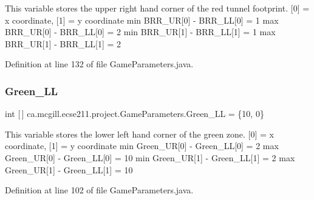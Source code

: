 This variable stores the upper right hand corner of the red tunnel footprint. \mbox{[}0\mbox{]} = x coordinate, \mbox{[}1\mbox{]} = y coordinate min B\+R\+R\+\_\+\+UR\mbox{[}0\mbox{]} -\/ B\+R\+R\+\_\+\+LL\mbox{[}0\mbox{]} = 1 max B\+R\+R\+\_\+\+UR\mbox{[}0\mbox{]} -\/ B\+R\+R\+\_\+\+LL\mbox{[}0\mbox{]} = 2 min B\+R\+R\+\_\+\+UR\mbox{[}1\mbox{]} -\/ B\+R\+R\+\_\+\+LL\mbox{[}1\mbox{]} = 1 max B\+R\+R\+\_\+\+UR\mbox{[}1\mbox{]} -\/ B\+R\+R\+\_\+\+LL\mbox{[}1\mbox{]} = 2 

Definition at line 132 of file Game\+Parameters.\+java.

\mbox{\label{classca_1_1mcgill_1_1ecse211_1_1project_1_1_game_parameters_a24e38b735e194403bf2b9877241969c1}} 
\subsubsection{\texorpdfstring{Green\+\_\+\+LL}{Green\_LL}}
{\footnotesize\ttfamily int \mbox{[}$\,$\mbox{]} ca.\+mcgill.\+ecse211.\+project.\+Game\+Parameters.\+Green\+\_\+\+LL = \{10, 0\}\hspace{0.3cm}{\ttfamily [static]}}

This variable stores the lower left hand corner of the green zone. \mbox{[}0\mbox{]} = x coordinate, \mbox{[}1\mbox{]} = y coordinate min Green\+\_\+\+UR\mbox{[}0\mbox{]} -\/ Green\+\_\+\+LL\mbox{[}0\mbox{]} = 2 max Green\+\_\+\+UR\mbox{[}0\mbox{]} -\/ Green\+\_\+\+LL\mbox{[}0\mbox{]} = 10 min Green\+\_\+\+UR\mbox{[}1\mbox{]} -\/ Green\+\_\+\+LL\mbox{[}1\mbox{]} = 2 max Green\+\_\+\+UR\mbox{[}1\mbox{]} -\/ Green\+\_\+\+LL\mbox{[}1\mbox{]} = 10 

Definition at line 102 of file Game\+Parameters.\+java.

\mbox{\label{classca_1_1mcgill_1_1ecse211_1_1project_1_1_game_parameters_aedb13ca3822f3581bdffd464891b1494}} 
